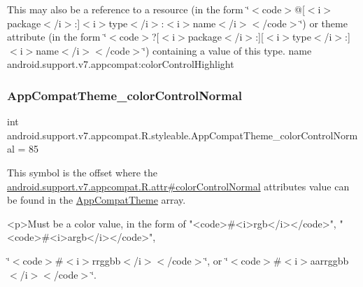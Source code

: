 This may also be a reference to a resource (in the form \char`\"{}$<$code$>$@\mbox{[}$<$i$>$package$<$/i$>$\+:\mbox{]}$<$i$>$type$<$/i$>$\+:$<$i$>$name$<$/i$>$$<$/code$>$\char`\"{}) or theme attribute (in the form \char`\"{}$<$code$>$?\mbox{[}$<$i$>$package$<$/i$>$\+:\mbox{]}\mbox{[}$<$i$>$type$<$/i$>$\+:\mbox{]}$<$i$>$name$<$/i$>$$<$/code$>$\char`\"{}) containing a value of this type.  name android.\+support.\+v7.\+appcompat\+:color\+Control\+Highlight \mbox{\label{classandroid_1_1support_1_1v7_1_1appcompat_1_1R_1_1styleable_a3a60170ac3e2b1e037970b2ba1eea507}} 
\subsubsection{\texorpdfstring{App\+Compat\+Theme\+\_\+color\+Control\+Normal}{AppCompatTheme\_colorControlNormal}}
{\footnotesize\ttfamily int android.\+support.\+v7.\+appcompat.\+R.\+styleable.\+App\+Compat\+Theme\+\_\+color\+Control\+Normal = 85\hspace{0.3cm}{\ttfamily [static]}}

This symbol is the offset where the \hyperlink{classandroid_1_1support_1_1v7_1_1appcompat_1_1R_1_1attr_a417dcb097ebfc94abe730fdbe0a8b424}{android.\+support.\+v7.\+appcompat.\+R.\+attr\#color\+Control\+Normal} attribute\textquotesingle{}s value can be found in the \hyperlink{classandroid_1_1support_1_1v7_1_1appcompat_1_1R_1_1styleable_a5c42f89e8a410c323be34208d75c430b}{App\+Compat\+Theme} array.

\begin{DoxyVerb}      <p>Must be a color value, in the form of "<code>#<i>rgb</i></code>", "<code>#<i>argb</i></code>",
\end{DoxyVerb}
 \char`\"{}$<$code$>$\#$<$i$>$rrggbb$<$/i$>$$<$/code$>$\char`\"{}, or \char`\"{}$<$code$>$\#$<$i$>$aarrggbb$<$/i$>$$<$/code$>$\char`\"{}. 


